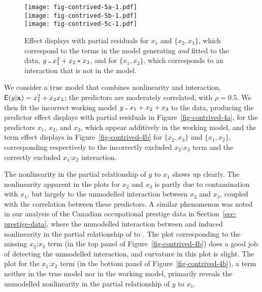 \documentclass[article]{jss}
\newcommand{\x}{\mathbf{x}}
\newcommand{\tild}{\symbol{126}}
\newcommand{\Rtilde}{\,\raisebox{-.5ex}{\code{\tild{}}}\,}
\newcommand{\inter}[2]{\mbox{$#1$:$#2$}}
\begin{document}
\begin{figure}[t!]
  \centering
    \texttt{[image: fig-contrived-5a-1.pdf]} \\
    \texttt{[image: fig-contrived-5b-1.pdf]}  \\
    \texttt{[image: fig-contrived-5c-1.pdf]}
  \caption{Effect displays with partial residuals for $x_1$ and $\{x_2, x_3 \}$, which correspond to the terms in the model generating \emph{and} fitted to the data, $y \Rtilde{} x_1^2 + x_2 * x_3$, and for $\{x_1, x_2 \}$, which corresponds to an interaction that is not in the model.}\label{fig-contrived-5}
\end{figure}

We consider a true model that combines nonlinearity and interaction,
$\E(y|\x) = x_1^2 + x_2 x_3$; the predictors are moderately
correlated, with $\rho = 0.5$. We then fit the incorrect working model
$y \Rtilde x_1 + x_2 + x_3$ to the data, producing the predictor
effect displays with partial residuals in
Figure~\ref{fig-contrived-4a}, for the predictors $x_1$, $x_2$, and
$x_3$, which appear additively in the working model, and the term
effect displays in Figure~\ref{fig-contrived-4b} for $\{x_2, x_3 \}$
and $\{x_1, x_2 \}$, corresponding respectively to the incorrectly
excluded \inter{x_2}{x_3} term and the correctly excluded
\inter{x_1}{x_2} interaction.

The nonlinearity in the partial relationship of $y$ to $x_1$ shows up
clearly. The nonlinearity apparent in the plots for $x_2$ and $x_3$ is
partly due to contamination with $x_1$, but largely to the unmodelled
interaction between $x_2$ and $x_3$, coupled with the correlation
between these predictors. A similar phenomenon was noted in our
analysis of the Canadian occupational prestige data in
Section~\ref{sec-prestige-data}, where the unmodelled interaction
between  and  induced nonlinearity in the
partial relationship of  to . The plot
corresponding to the missing \inter{x_2}{x_3} term (in the top panel
of Figure~\ref{fig-contrived-4b}) does a good job of detecting the
unmodelled interaction, and curvature in this plot is slight. The plot
for the \inter{x_1}{x_2} term (in the bottom panel of
Figure~\ref{fig-contrived-4b}), a term neither in the true model nor
in the working model, primarily reveals the unmodelled nonlinearity in
the partial relationship of $y$ to $x_1$.
\end{document}

